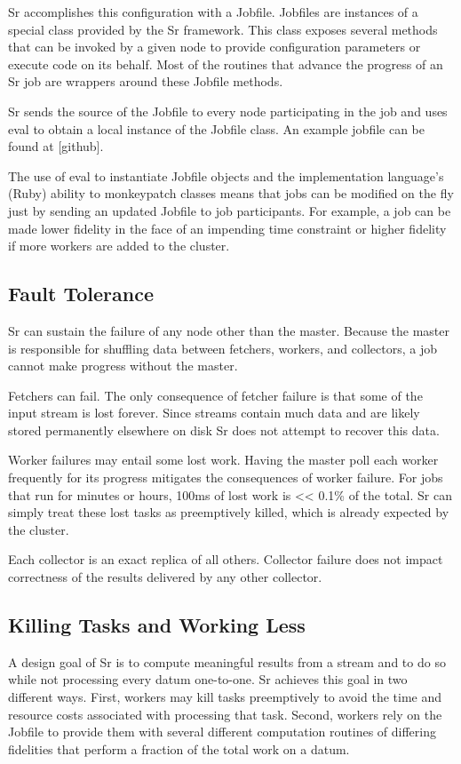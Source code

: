 \documentclass[12pt]{article}
\begin{document}
Sr accomplishes this configuration with a Jobfile. Jobfiles are instances of a special class
provided by the Sr framework. This class exposes several methods that can be invoked by a
given node to provide configuration parameters or execute code on its behalf. Most of the
routines that advance the progress of an Sr job are wrappers around these Jobfile methods.

Sr sends the source of the Jobfile to every node participating in the job and uses eval to
obtain a local instance of the Jobfile class. An example jobfile can be found at [github].

The use of eval to instantiate Jobfile objects and the implementation language’s (Ruby)
ability to monkeypatch classes means that jobs can be modified on the fly just by sending
an updated Jobfile to job participants. For example, a job can be made lower fidelity in
the face of an impending time constraint or higher fidelity if more workers are added to
the cluster.
\subsection{Fault Tolerance}
Sr can sustain the failure of any node other than the master. Because the master is responsible
for shuffling data between fetchers, workers, and collectors, a job cannot make progress without
the master.

Fetchers can fail. The only consequence of fetcher failure is that some of the input stream is
lost forever. Since streams contain much data and are likely stored permanently elsewhere on disk
Sr does not attempt to recover this data.

Worker failures may entail some lost work. Having the master poll each worker frequently for its
progress mitigates the consequences of worker failure. For jobs that run for minutes or hours,
100ms of lost work is << 0.1\% of the total. Sr can simply treat these lost tasks as preemptively
killed, which is already expected by the cluster.

Each collector is an exact replica of all others. Collector failure does not impact correctness of
the results delivered by any other collector.
\subsection{Killing Tasks and Working Less}
A design goal of Sr is to compute meaningful results from a stream and to do so while not
processing every datum one-to-one. Sr achieves this goal in two different ways. First, workers
may kill tasks preemptively to avoid the time and resource costs associated with processing
that task. Second, workers rely on the Jobfile to provide them with several different
computation routines of differing fidelities that perform a fraction of the total work on a
datum.
\end{document}
